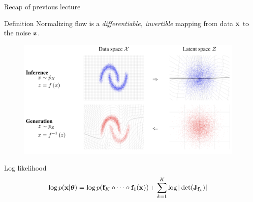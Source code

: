 \begin{frame}{Recap of previous lecture}
	\begin{block}{Definition}
		Normalizing flow is a \textit{differentiable, invertible} mapping from data $\mathbf{x}$ to the noise $\mathbf{z}$. 
	\end{block}
	\vspace{-0.1cm}
	\begin{figure}
		\includegraphics[width=0.85\linewidth]{figs/flows_how2}
	\end{figure}
	\vspace{-0.5cm}
	\begin{block}{Log likelihood}
		\vspace{-0.5cm}
		\[
			\log p(\mathbf{x} | \boldsymbol{\theta}) = \log p(\mathbf{f}_K \circ \dots \circ \mathbf{f}_1(\mathbf{x})) + \sum_{k=1}^K\log |\det (\mathbf{J}_{\mathbf{f}_k})|
		\]
	\end{block}
\end{frame}
